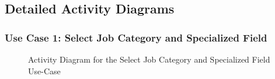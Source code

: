 \subsection{Detailed Activity Diagrams}
\subsubsection{Use Case 1: Select Job Category and Specialized Field} 

\newpage
\begin{figure}[H]
    \centering
    \caption{ Activity Diagram for the Select Job Category and Specialized Field Use-Case }
    \label{fig:UseCase1Sprint2_Activity_Diagram}
\end{figure}



